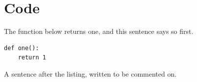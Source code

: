 \documentclass{article}
\begin{document}
\section{Code}
The function below returns one, and this sentence says so first.
\begin{verbatim}
def one():
    return 1
\end{verbatim}
A sentence after the listing, written to be commented on.
\end{document}
